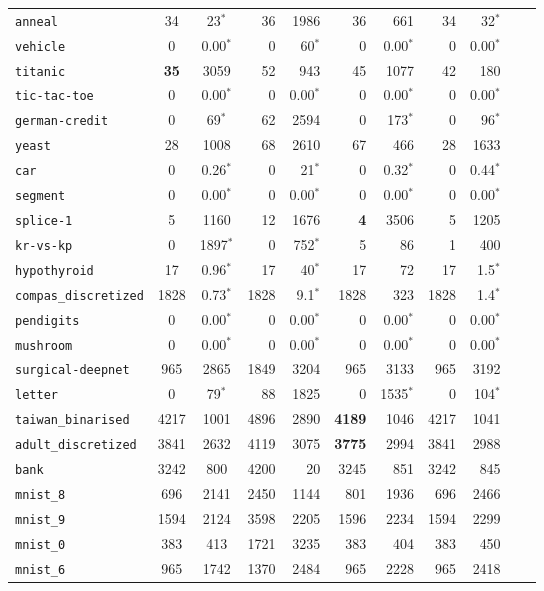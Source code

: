 \begin{tabular}{lccrrrrrrrr}
\texttt{anneal} & 34 & 23$^*$ & 36 & 1986 & 36 & 661 & 34 & 32$^*$\\
\texttt{vehicle} & 0 & 0.00$^*$ & 0 & 60$^*$ & 0 & 0.00$^*$ & 0 & 0.00$^*$\\
\texttt{titanic} & \textbf{35} & 3059 & 52 & 943 & 45 & 1077 & 42 & 180\\
\texttt{tic-tac-toe} & 0 & 0.00$^*$ & 0 & 0.00$^*$ & 0 & 0.00$^*$ & 0 & 0.00$^*$\\
\texttt{german-credit} & 0 & 69$^*$ & 62 & 2594 & 0 & 173$^*$ & 0 & 96$^*$\\
\texttt{yeast} & 28 & 1008 & 68 & 2610 & 67 & 466 & 28 & 1633\\
\texttt{car} & 0 & 0.26$^*$ & 0 & 21$^*$ & 0 & 0.32$^*$ & 0 & 0.44$^*$\\
\texttt{segment} & 0 & 0.00$^*$ & 0 & 0.00$^*$ & 0 & 0.00$^*$ & 0 & 0.00$^*$\\
\texttt{splice-1} & 5 & 1160 & 12 & 1676 & \textbf{4} & 3506 & 5 & 1205\\
\texttt{kr-vs-kp} & 0 & 1897$^*$ & 0 & 752$^*$ & 5 & 86 & 1 & 400\\
\texttt{hypothyroid} & 17 & 0.96$^*$ & 17 & 40$^*$ & 17 & 72 & 17 & 1.5$^*$\\
\texttt{compas\_discretized} & 1828 & 0.73$^*$ & 1828 & 9.1$^*$ & 1828 & 323 & 1828 & 1.4$^*$\\
\texttt{pendigits} & 0 & 0.00$^*$ & 0 & 0.00$^*$ & 0 & 0.00$^*$ & 0 & 0.00$^*$\\
\texttt{mushroom} & 0 & 0.00$^*$ & 0 & 0.00$^*$ & 0 & 0.00$^*$ & 0 & 0.00$^*$\\
\texttt{surgical-deepnet} & 965 & 2865 & 1849 & 3204 & 965 & 3133 & 965 & 3192\\
\texttt{letter} & 0 & 79$^*$ & 88 & 1825 & 0 & 1535$^*$ & 0 & 104$^*$\\
\texttt{taiwan\_binarised} & 4217 & 1001 & 4896 & 2890 & \textbf{4189} & 1046 & 4217 & 1041\\
\texttt{adult\_discretized} & 3841 & 2632 & 4119 & 3075 & \textbf{3775} & 2994 & 3841 & 2988\\
\texttt{bank} & 3242 & 800 & 4200 & 20 & 3245 & 851 & 3242 & 845\\
\texttt{mnist\_8} & 696 & 2141 & 2450 & 1144 & 801 & 1936 & 696 & 2466\\
\texttt{mnist\_9} & 1594 & 2124 & 3598 & 2205 & 1596 & 2234 & 1594 & 2299\\
\texttt{mnist\_0} & 383 & 413 & 1721 & 3235 & 383 & 404 & 383 & 450\\
\texttt{mnist\_6} & 965 & 1742 & 1370 & 2484 & 965 & 2228 & 965 & 2418\\

\end{tabular}
